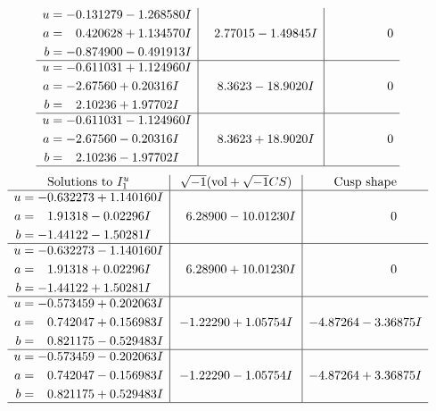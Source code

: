 \documentclass[1p]{elsarticle_modified}
\theoremstyle{definition}
\newcommand{\I}{\sqrt{-1}}
\begin{document}
$$\begin{array}{c|c|c}
\begin{aligned}
u &= -0.131279 - 1.268580 I \\
a &= \phantom{-}0.420628 + 1.134570 I \\
b &= -0.874900 - 0.491913 I\end{aligned}
 & \phantom{-}2.77015 - 1.49845 I & \phantom{-0.000000 } 0 \\ \hline\begin{aligned}
u &= -0.611031 + 1.124960 I \\
a &= -2.67560 + 0.20316 I \\
b &= \phantom{-}2.10236 + 1.97702 I\end{aligned}
 & \phantom{-}8.3623 - 18.9020 I & \phantom{-0.000000 } 0 \\ \hline\begin{aligned}
u &= -0.611031 - 1.124960 I \\
a &= -2.67560 - 0.20316 I \\
b &= \phantom{-}2.10236 - 1.97702 I\end{aligned}
 & \phantom{-}8.3623 + 18.9020 I & \phantom{-0.000000 } 0\\
 \hline 
 \end{array}$$\newpage$$\begin{array}{c|c|c}  
\text{Solutions to }I^u_{1}& \I (\text{vol} + \sqrt{-1}CS) & \text{Cusp shape}\\
 \hline 
\begin{aligned}
u &= -0.632273 + 1.140160 I \\
a &= \phantom{-}1.91318 - 0.02296 I \\
b &= -1.44122 - 1.50281 I\end{aligned}
 & \phantom{-}6.28900 - 10.01230 I & \phantom{-0.000000 } 0 \\ \hline\begin{aligned}
u &= -0.632273 - 1.140160 I \\
a &= \phantom{-}1.91318 + 0.02296 I \\
b &= -1.44122 + 1.50281 I\end{aligned}
 & \phantom{-}6.28900 + 10.01230 I & \phantom{-0.000000 } 0 \\ \hline\begin{aligned}
u &= -0.573459 + 0.202063 I \\
a &= \phantom{-}0.742047 + 0.156983 I \\
b &= \phantom{-}0.821175 - 0.529483 I\end{aligned}
 & -1.22290 + 1.05754 I & -4.87264 - 3.36875 I \\ \hline\begin{aligned}
u &= -0.573459 - 0.202063 I \\
a &= \phantom{-}0.742047 - 0.156983 I \\
b &= \phantom{-}0.821175 + 0.529483 I\end{aligned}
 & -1.22290 - 1.05754 I & -4.87264 + 3.36875 I\\
 \hline 
 \end{array}$$\newpage\newpage\renewcommand{\arraystretch}{1}
\end{document}
